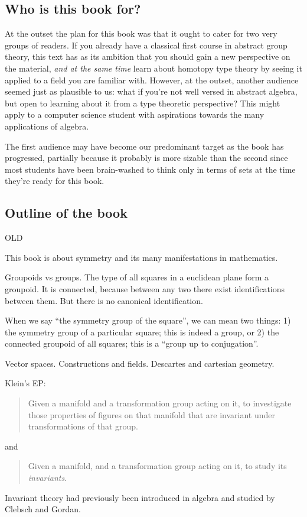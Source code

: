 \subsection{Who is this book for?}
\label{sec:who}
At the outset the plan for this book was that it ought to cater for two very groups of readers. If you already have a classical first course in abstract group theory, this text has as its ambition that you should gain a new perspective on the material, \emph{and at the same time} learn about homotopy type theory by seeing it applied to a field you are familiar with. However, at the outset, another audience seemed just as plausible to us: what if you're not well versed in abstract algebra, but open to learning about it from a type theoretic perspective? This might apply to a computer science student with aspirations towards the many applications of algebra.

The first audience may have become our predominant target as the book has progressed, partially because it probably is more sizable than the second since most students have been brain-washed to think only in terms of sets at the time they're ready for this book.

\subsection{Outline of the book}
\label{sec:outline}

%






OLD

This book is about symmetry and its many manifestations in mathematics.

Groupoids vs groups.
The type of all squares in a euclidean plane form a groupoid.
It is connected,
because between any two there exist identifications between them.
But there is no canonical identification.

When we say ``the symmetry group of the square'',
we can mean two things:
1) the symmetry group of a particular square;
this is indeed a group,
or 2) the connected groupoid of all squares;
this is a ``group up to conjugation''.

Vector spaces. Constructions and fields. Descartes and cartesian geometry.

Klein's EP:
\begin{quote}
  Given a manifold and a transformation group acting on it,
  to investigate those properties of figures on that manifold
  that are invariant under transformations of that group.
\end{quote}
and
\begin{quote}
  Given a manifold, and a transformation group acting on it,
  to study its \emph{invariants}.
\end{quote}
Invariant theory had previously been introduced in algebra
and studied by Clebsch and Gordan.

